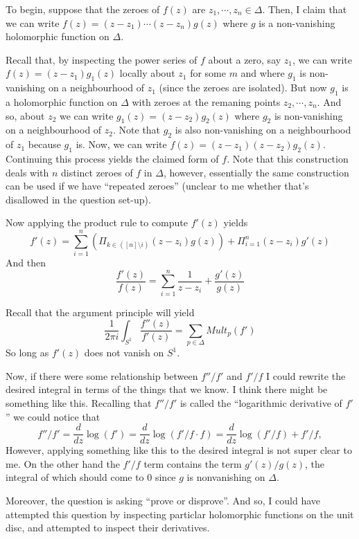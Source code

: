\documentclass[12pt,letterpaper,boxed]{hmcpset}
\newenvironment{wgenv}{\color{violet}}{}
\begin{document}
\begin{solution}
To begin, suppose that the zeroes of $f(z)$ are $z_1, \cdots, z_n \in
\Delta$. 
Then, I claim that we can write $f(z) = (z- z_1) \cdots (z - z_n)
g(z)$ where $g$ is a non-vanishing holomorphic function on $\Delta$.

Recall that, by inspecting the power series of $f$ about a zero, say
$z_1$, we can write $f(z) = (z-z_1) g_1(z)$ locally about $z_1$ for some $m$ and where
$g_1$ is non-vanishing on a neighbourhood of $z_1$ (since the zeroes
are isolated). 
But now $g_1$ is a holomorphic function on $\Delta$ with zeroes at the
remaning points $z_2, \cdots, z_n$. And so, about $z_2$ we can write
$g_1(z) = (z-z_2)g_2(z)$ where $g_2$ is non-vanishing on a
neighbourhood of $z_2$. Note that $g_2$ is also non-vanishing on a
neighbourhood of $z_1$ because $g_1$ is.
Now, we can write $f(z) = (z-z_1)(z-z_2)g_2(z)$. Continuing this
process yields the claimed form of $f$.
Note that this construction deals with $n$ distinct zeroes of $f$ in
$\Delta$, however, essentially the same construction can be used if we
have ``repeated zeroes'' (unclear to me whether that's disallowed in the
question set-up). 

Now applying the product rule to compute $f'(z)$ yields
\[
	f'(z) = \sum_{i=1}^n (\Pi_{k \in ([n]\setminus i)} (z-z_i) g(z)) + \Pi_{i=1}^n (z-z_i) g'(z)
\]
And then 
\[
	\frac{f'(z)}{f(z)} = \sum_{i=1}^n \frac{1}{z-z_i} + \frac{g'(z)}{g(z)}
\]

Recall that the argument principle will yield
\[
	\frac{1}{2\pi i} \int_{S^1} \frac{f''(z)}{f'(z)} = \sum_{p \in \Delta} Mult_p(f')
\]
So long as $f'(z)$ does not vanish on $S^1$. 

\begin{wgenv}
Now, if there were some relationship between $f''/f'$ and $f'/f$ 
I could rewrite the desired integral in terms of the things that we
know. I think there might be something like this. 
Recalling that $f''/f'$ is called the ``logarithmic derivative of
$f'$'' we could notice that 
\[
	f''/f' = \frac{d}{dz} \log(f') = \frac{d}{dz} \log(f'/f \cdot f)
	= \frac{d}{dz} \log(f'/f) + f'/f,
\]
However, applying something like this to the desired integral is not
super clear to me. 
On the other
hand the $f'/f$ term contains the term $g'(z)/g(z)$, the integral of
which should come to $0$ since $g$ is nonvanishing on $\Delta$. 

Moreover, the question is asking ``prove or disprove''. And so, I
could have attempted this question by inspecting particlar holomorphic functions on
the unit disc, and attempted to inspect their derivatives. 
\end{wgenv}

\end{solution}

\newpage
\end{document}
